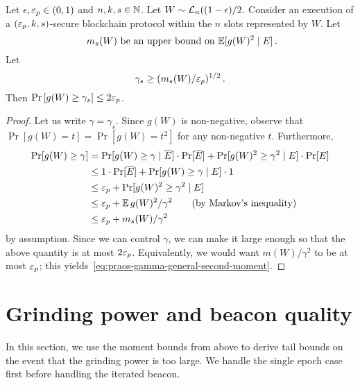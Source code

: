 \begin{lemma}\label{lemma:praos-tail-gamma}
  Let $\epsilon, \mathsf{\varepsilon}_p \in (0, 1)$ and $n, k, s \in \mathbb{N}$. 
  Let $W \sim \mathcal{L}_n((1-\epsilon)/2$.
  Consider an execution of a $(\mathsf{\varepsilon}_p, k, s)$-secure blockchain protocol within
  the $n$ slots represented by $W$. 
  Let 
  $$
    \text{ $m_s(W)$ be an upper bound on $\operatorname{\mathbb{E}}[ g(W)^2 \mid E]$}\,.
  $$
  Let 
  \begin{equation}\label{eq:praos-gamma-general-second-moment}
    \gamma_s \geq (m_s(W)/\mathsf{\varepsilon}_p)^{1/2}
    \,.
  \end{equation}
  Then 
  $
      \Pr\left[g(W) \geq \gamma_s \right] \leq 2 \mathsf{\varepsilon}_p
  $.
\end{lemma}
\begin{proof}
  Let us write $\gamma = \gamma_s$.
  Since $g(W)$ is non-negative, observe that 
  $\Pr[g(W) = t] = \Pr[g(W) = t^2]$ for any non-negative $t$. 
  Furthermore, 
  \begin{align*}
    \Pr[g(W) \geq \gamma]
    &= \Pr[g(W) \geq \gamma \mid \overline{E}] \cdot \Pr[\overline{E}] 
      + \Pr[g(W)^2 \geq \gamma^2 \mid E] \cdot \Pr[E]\\
    &\leq 1 \cdot \Pr[\overline{E}] + \Pr[g(W) \geq \gamma \mid E] \cdot 1 \\
    &\leq \mathsf{\varepsilon}_p + \Pr[g(W)^2 \geq \gamma^2 \mid E] \\
    &\leq \mathsf{\varepsilon}_p + \operatorname{\mathbb{E}} g(W)^2/\gamma^2 \qquad \text{(by Markov's inequality)} \\
    &\leq \mathsf{\varepsilon}_p + m_s(W)/\gamma^2 
  \end{align*}
  by assumption. Since we can control $\gamma$,
  we can make it large enough so that the above quantity is at most $2 \mathsf{\varepsilon}_p$. 
  Equivalently, we would want 
  $m(W)/\gamma^2$ to be at most $\mathsf{\varepsilon}_p$; 
  this yields~\eqref{eq:praos-gamma-general-second-moment}. 
\end{proof}


\section{Grinding power and beacon quality}
In this section, 
we use the moment bounds from above to derive tail bounds 
on the event that the grinding power is too large. 
We handle the single epoch case first before handling the iterated beacon.

